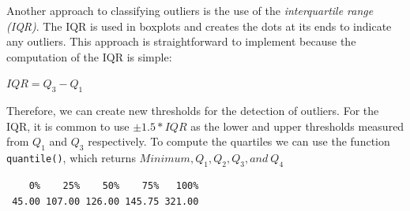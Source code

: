 \documentclass[
  letterpaper,
]{krantz}
\makeatletter
\newenvironment{Shaded}{\begin{snugshade}}{\end{snugshade}}
\newcommand{\AttributeTok}[1]{\textcolor[rgb]{0.40,0.45,0.13}{#1}}
\newcommand{\CommentTok}[1]{\textcolor[rgb]{0.37,0.37,0.37}{#1}}
\newcommand{\ConstantTok}[1]{\textcolor[rgb]{0.56,0.35,0.01}{#1}}
\newcommand{\DecValTok}[1]{\textcolor[rgb]{0.68,0.00,0.00}{#1}}
\newcommand{\FloatTok}[1]{\textcolor[rgb]{0.68,0.00,0.00}{#1}}
\newcommand{\FunctionTok}[1]{\textcolor[rgb]{0.28,0.35,0.67}{#1}}
\newcommand{\NormalTok}[1]{\textcolor[rgb]{0.00,0.23,0.31}{#1}}
\newcommand{\OtherTok}[1]{\textcolor[rgb]{0.00,0.23,0.31}{#1}}
\newcommand{\SpecialCharTok}[1]{\textcolor[rgb]{0.37,0.37,0.37}{#1}}
\newcommand{\StringTok}[1]{\textcolor[rgb]{0.13,0.47,0.30}{#1}}
\newenvironment{kframe}{%
\medskip{}
\setlength{\fboxsep}{.8em}
 \def\at@end@of@kframe{}%
 \ifinner\ifhmode%
  \def\at@end@of@kframe{\end{minipage}}%
  \begin{minipage}{\columnwidth}%
 \fi\fi%
 \def\FrameCommand##1{\hskip\@totalleftmargin \hskip-\fboxsep
 \colorbox{shadecolor}{##1}\hskip-\fboxsep
     \hskip-\linewidth \hskip-\@totalleftmargin \hskip\columnwidth}%
 \MakeFramed {\advance\hsize-\width
   \@totalleftmargin\z@ \linewidth\hsize
   \@setminipage}}%
 {\par\unskip\endMakeFramed%
 \at@end@of@kframe}
\renewenvironment{Shaded}{\begin{kframe}}{\end{kframe}}
\makeatother
\begin{document}
Another approach to classifying outliers is the use of the
\emph{interquartile range (IQR)}. The IQR is used in boxplots and
creates the dots at its ends to indicate any outliers. This approach is
straightforward to implement because the computation of the IQR is
simple:

\label{iqr-formula}
\(IQR = Q_{3}-Q_{1}\)

Therefore, we can create new thresholds for the detection of outliers.
For the IQR, it is common to use \(\pm 1.5 * IQR\) as the lower and
upper thresholds measured from \(Q_1\) and \(Q_3\) respectively. To
compute the quartiles we can use the function \texttt{quantile()}, which
returns \(Minimum, Q_1, Q_2, Q_3, and\ Q_4\)

\begin{Shaded}
\end{Shaded}

\begin{verbatim}
    0%    25%    50%    75%   100% 
 45.00 107.00 126.00 145.75 321.00 
\end{verbatim}

\begin{Shaded}
\end{Shaded}
\end{document}
